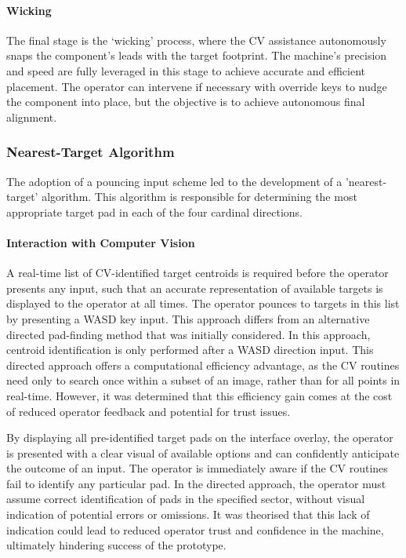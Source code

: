 \documentclass[12pt,british,UKenglish]{article}
\begin{document}
\paragraph{Wicking}
The final stage is the `wicking' process, where the \ac{CV} assistance autonomously snaps the component's leads with the target footprint.
The machine's precision and speed are fully leveraged in this stage to achieve accurate and efficient placement.
The operator can intervene if necessary with override keys to nudge the component into place, but the objective is to achieve autonomous final alignment.


\subsubsection{Nearest-Target Algorithm}\label{sec:Nearest-Target}


The adoption of a pouncing input scheme led to the development of a 'nearest-target' algorithm.
This algorithm is responsible for determining the most appropriate target pad in each of the four cardinal directions.


\paragraph{Interaction with Computer Vision}
A real-time list of \ac{CV}-identified target centroids is required before the operator presents any input, such that an accurate representation of available targets is displayed to the operator at all times.
The operator pounces to targets in this list by presenting a WASD key input.
This approach differs from an alternative directed pad-finding method that was initially considered.
In this approach, centroid identification is only performed after a WASD direction input.
This directed approach offers a computational efficiency advantage, as the \ac{CV} routines need only to search once within a subset of an image, rather than for all points in real-time.
However, it was determined that this efficiency gain comes at the cost of reduced operator feedback and potential for trust issues.

By displaying all pre-identified target pads on the interface overlay, the operator is presented with a clear visual of available options and can confidently anticipate the outcome of an input.
The operator is immediately aware if the \ac{CV} routines fail to identify any particular pad.
In the directed approach, the operator must assume correct identification of pads in the specified sector, without visual indication of potential errors or omissions.
It was theorised that this lack of indication could lead to reduced operator trust and confidence in the machine, ultimately hindering success of the prototype.
\end{document}
